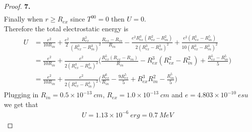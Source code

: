 \documentclass[11pt]{article}
\newcommand{\sci}[1]{\times 10^{#1}}
\theoremstyle{definition}
\begin{document}
\begin{proof}{\textbf{7.}}
\begin{align*}
\end{align*}
Finally when $r \geq R_{ex}$ since $T^{00} = 0$ then $U = 0$.
\\
Therefore the total electrostatic energy is
\begin{align*}
    U &= \frac{e^2}{10R_{in}}
    + \frac{e^2}{2}\frac{R_{ex}^5}{(R_{ex}^3 - R_{in}^3)^2}\frac{R_{ex} - R_{in}}{R_{in}}
    - \frac{e^2R_{ex}^3(R_{ex}^2 - R_{in}^2)}{2(R_{ex}^3 - R_{in}^3)^2}
    + \frac{e^2(R_{ex}^5 - R_{in}^5)}{10(R_{ex}^3 - R_{in}^3)^2}\\
    &= \frac{e^2}{10R_{in}}
    + \frac{e^2}{2(R_{ex}^3 - R_{in}^3)^2}\bigg(
        \frac{R_{ex}^5(R_{ex} - R_{in})}{R_{in}}
        - R_{ex}^3(R_{ex}^2 - R_{in}^2)
        + \frac{R_{ex}^5 - R_{in}^5}{5}
    \bigg)\\
    &= \frac{e^2}{10R_{in}}
    + \frac{e^2}{2(R_{ex}^3 - R_{in}^3)^2}\bigg(
        \frac{R_{ex}^6}{R_{in}} - \frac{9R_{ex}^5}{5} + R_{ex}^3R_{in}^2
        - \frac{R_{in}^5}{5}
    \bigg)
\end{align*}
Plugging in $R_{in} = 0.5\sci{-13}~cm$, $R_{ex} = 1.0\sci{-13}~cm$ and
$e =4.803\sci{-10}~esu$ we get that
\begin{align*}
    U = 1.13\sci{-6}~erg = 0.7~MeV
\end{align*}
\end{proof}
\end{document}
